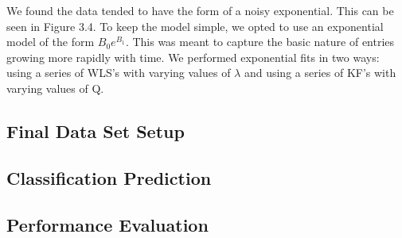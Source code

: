 We found the data tended to have the form of a noisy exponential. This can be seen in Figure 3.4. To keep the model simple, we opted to use an exponential model of the form $B_{0}e^{B_{1}}$. This was meant to capture the basic nature of entries growing more rapidly with time. We performed exponential fits in two ways: using a series of WLS's with varying values of $\lambda$ and using a series of KF's with varying values of Q.

\subsection{Final Data Set Setup}



\subsection{Classification Prediction}



\subsection{Performance Evaluation}


